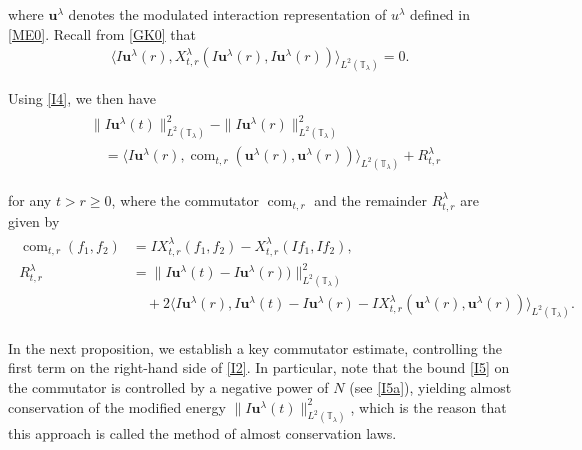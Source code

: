\documentclass[letterpaper, 11pt,  reqno]{amsart}
\DeclareMathOperator{\com}{com}
\newcommand{\1}{\hspace{0.5mm}\text{I}\hspace{0.5mm}}
\newcommand{\noi}{\noindent}
\newcommand{\T}{\mathbb{T}}
\newcommand{\ld}{\lambda}
\newcommand{\uu}{\mathbf{u}}
\numberwithin{equation}{section}
\numberwithin{theorem}{section}
\begin{document}
\noi
where $\uu^\ld$ denotes the modulated interaction representation of $u^\ld$
defined in  \eqref{ME0}.
Recall from \eqref{GK0} that 
\begin{align}
\big\langle 
I \uu^\ld(r) , X^\ld_{t,r} ( I \uu^\ld(r) , I \uu^\ld(r) )
\big\rangle_{L^2(\T_\ld)}= 0.
\label{I4}
\end{align}

\noi
Using \eqref{I4}, 
we then have 
\begin{align}
\begin{split}
& \| I \uu^\ld(t) \|^2_{L^2(\T_\ld)} -  \| I \uu^\ld(r) \|^2_{L^2(\T_\ld)}\\
& \quad =\big\langle 
I \uu^\ld(r)  ,   \com_{t, r}(\uu^\ld(r), \uu^\ld(r))
\big\rangle_{L^2(\T_\ld)} 
+ R^\ld_{t,r}
\end{split}
\label{I2}
\end{align}



\noi
for any $t > r \ge 0$, 
where the commutator  $\com_{t, r}$ and the remainder $R^\ld_{t, r}$ are given by 
\begin{align}
\begin{split}
\com_{t, r}(f_1, f_2)
& =  I X^{\ld}_{t,r}(f_1, f_2 ) - X^{\ld}_{t,r}(I f_1, If_2), 
\\
R^\ld_{t,r}
& =\| I  \uu^\ld(t)-I\uu^\ld(r)) \|_{L^2(\T_\ld)}^2\\
& \quad 
+
2
\big\langle 
I \uu^\ld(r) , I \uu^\ld(t) - I \uu^\ld(r) -  I X^{\ld}_{t,r}( \uu^\ld(r) , \uu^\ld(r) )
\big\rangle_{L^2(\T_\ld)}.
\end{split}
\label{I3}
\end{align}




\noi
In the next proposition, 
we establish a key commutator estimate, 
controlling the first term on the right-hand side of \eqref{I2}.
In particular,  note that the bound \eqref{I5}
on the commutator is controlled by a negative power of $N$ (see \eqref{I5a}),
yielding almost conservation of the modified energy 
$\| I \uu^\ld(t)\|^2_{L^2(\T_\ld)}$, 
which is the reason that this approach is called the method
of almost conservation laws.
\end{document}
